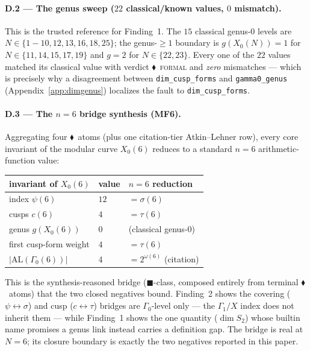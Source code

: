 \documentclass[11pt,a4paper]{article}
\newcommand{\tierF}{\textcolor{blue!60!black}{$\blacklozenge$}}   %
\newcommand{\tierN}{\textcolor{green!50!black}{$\blacksquare$}}    %
\newcommand{\sig}{\sigma}
\newcommand{\Gz}{\Gamma_0}
\newcommand{\Go}{\Gamma_1}
\theoremstyle{definition}
\begin{document}
\paragraph{D.2 --- The genus sweep ($22$ classical/known values, $0$ mismatch).}
This is the trusted reference for Finding~1. The $15$ classical genus-$0$ levels
are $N\in\{1\!-\!10,12,13,16,18,25\}$; the genus-$\ge 1$ boundary is
$g(X_0(N))=1$ for $N\in\{11,14,15,17,19\}$ and $g=2$ for $N\in\{22,23\}$. Every
one of the $22$ values matched its classical value with verdict \tierF\
\textsc{formal} and \emph{zero} mismatches --- which is precisely why a
disagreement between \texttt{dim\_cusp\_forms} and \texttt{gamma0\_genus}
(Appendix~\ref{app:dimgenus}) localizes the fault to \texttt{dim\_cusp\_forms}.

\paragraph{D.3 --- The $n=6$ bridge synthesis (MF6).} Aggregating four \tierF\
atoms (plus one citation-tier Atkin--Lehner row), every core invariant of the
modular curve $X_0(6)$ reduces to a standard $n=6$ arithmetic-function value:
\begin{center}
\begin{tabular}{lll}
\toprule
invariant of $X_0(6)$ & value & $n=6$ reduction \\
\midrule
index $\psi(6)$            & $12$ & $=\sig(6)$ \\
cusps $c(6)$               & $4$  & $=\tau(6)$ \\
genus $g(X_0(6))$          & $0$  & (classical genus-$0$) \\
first cusp-form weight     & $4$  & $=\tau(6)$ \\
$|\mathrm{AL}(\Gz(6))|$    & $4$  & $=2^{\omega(6)}$ (citation) \\
\bottomrule
\end{tabular}
\end{center}
\noindent
This is the synthesis-reasoned bridge (\tierN-class, composed entirely from
terminal \tierF\ atoms) that the two closed negatives bound. Finding~2 shows the
covering ($\psi\!\leftrightarrow\!\sig$) and cusp ($c\!\leftrightarrow\!\tau$)
bridges are $\Gz$-level only --- the $\Go/X$ index does not inherit them ---
while Finding~1 shows the one quantity ($\dim S_2$) whose builtin name promises a
genus link instead carries a definition gap. The bridge is real at $N=6$; its
closure boundary is exactly the two negatives reported in this paper.
\end{document}
